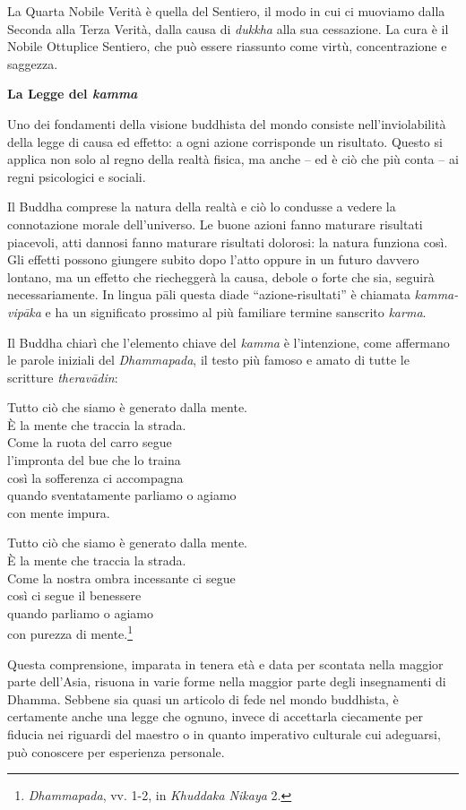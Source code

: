 La Quarta Nobile Verità è quella del Sentiero, il modo in cui ci
muoviamo dalla Seconda alla Terza Verità, dalla causa di \emph{dukkha}
alla sua cessazione. La cura è il Nobile Ottuplice Sentiero, che può
essere riassunto come virtù, concentrazione e saggezza.

\textbf{La Legge del \emph{kamma}}

Uno dei fondamenti della visione buddhista del mondo consiste
nell'inviolabilità della legge di causa ed effetto: a ogni azione
corrisponde un risultato. Questo si applica non solo al regno della
realtà fisica, ma anche -- ed è ciò che più conta -- ai regni
psicologici e sociali.

Il Buddha comprese la natura della realtà e ciò lo condusse a vedere la
connotazione morale dell'universo. Le buone azioni fanno maturare
risultati piacevoli, atti dannosi fanno maturare risultati dolorosi: la
natura funziona così. Gli effetti possono giungere subito dopo l'atto
oppure in un futuro davvero lontano, ma un effetto che riecheggerà la
causa, debole o forte che sia, seguirà necessariamente. In lingua pāli
questa diade ``azione-risultati'' è chiamata \emph{kamma-vipāka} e ha un
significato prossimo al più familiare termine sanscrito \emph{karma}.

Il Buddha chiarì che l'elemento chiave del \emph{kamma} è l'intenzione,
come affermano le parole iniziali del \emph{Dhammapada}, il testo più
famoso e amato di tutte le scritture \emph{theravādin}:

Tutto ciò che siamo è generato dalla mente.\\
È la mente che traccia la strada.\\
Come la ruota del carro segue\\
l'impronta del bue che lo traina\\
così la sofferenza ci accompagna\\
quando sventatamente parliamo o agiamo\\
con mente impura.

Tutto ciò che siamo è generato dalla mente.\\
È la mente che traccia la strada.\\
Come la nostra ombra incessante ci segue\\
così ci segue il benessere\\
quando parliamo o agiamo\\
con purezza di mente.\footnote{\emph{Dhammapada}, vv. 1-2, in
  \emph{Khuddaka Nikaya} 2.}

Questa comprensione, imparata in tenera età e data per scontata nella
maggior parte dell'Asia, risuona in varie forme nella maggior parte
degli insegnamenti di Dhamma. Sebbene sia quasi un articolo di fede nel
mondo buddhista, è certamente anche una legge che ognuno, invece di
accettarla ciecamente per fiducia nei riguardi del maestro o in quanto
imperativo culturale cui adeguarsi, può conoscere per esperienza
personale.

